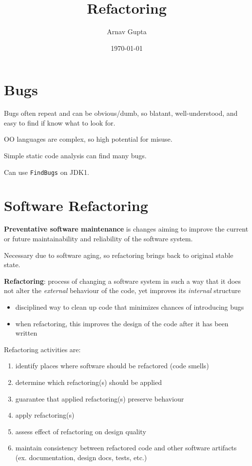 \documentclass[11pt]{article}
\author{Arnav Gupta}
\date{\today}
\title{Refactoring}
\begin{document}
\maketitle
\tableofcontents

\section{Bugs}
\label{sec:org78203d3}
Bugs often repeat and can be obvious/dumb, so blatant, well-understood, and easy to find if know what
to look for.

OO languages are complex, so high potential for misuse.

Simple static code analysis can find many bugs.

Can use \texttt{FindBugs} on JDK1.
\section{Software Refactoring}
\label{sec:orgadb77fc}
\textbf{Preventative software maintenance} is changes aiming to improve the current or future maintainability
and reliability of the software system.

Necessary due to software aging, so refactoring brings back to original stable state.

\textbf{Refactoring}: process of changing a software system in such a way that it does not alter the
\emph{external} behaviour of the code, yet improves its \emph{internal} structure
\begin{itemize}
\item disciplined way to clean up code that minimizes chances of introducing bugs
\item when refactoring, this improves the design of the code after it has been written
\end{itemize}

Refactoring activities are:
\begin{enumerate}
\item identify places where software should be refactored (code smells)
\item determine which refactoring(s) should be applied
\item guarantee that applied refactoring(s) preserve behaviour
\item apply refactoring(s)
\item assess effect of refactoring on design quality
\item maintain consistency between refactored code and other software artifacts (ex. documentation, design
docs, tests, etc.)
\end{enumerate}
\end{document}
